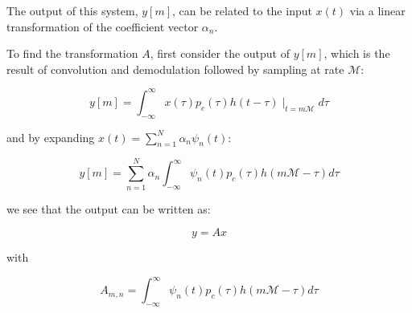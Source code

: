 \documentclass[12pt]{report}
\begin{document}
The output of this system, \(y\left[m\right]\), can be related to the input \(x\left(t\right)\) via a linear transformation of the coefficient vector \(\alpha_n\). 

To find the transformation \(A\), first consider the output of \(y\left[m\right]\), which is the result of convolution and demodulation followed by sampling at rate \(\mathcal{M}\):

\begin{equation}
y\left[m\right] = \int_{-\infty}^{\infty} x\left(\tau\right)p_c\left(\tau\right)h\left(t - \tau\right)\mid_{t = m\mathcal{M}}d\tau
\end{equation}

and by expanding \(x\left(t\right) = \sum_{n=1}^N \alpha_n \psi_n\left(t\right)\):

\begin{equation}
y\left[m\right] =  \sum_{n=1}^N \alpha_n \int_{-\infty}^{\infty} \psi_n\left(t\right)p_c\left(\tau\right)h\left(m\mathcal{M} - \tau\right)d\tau
\end{equation}

we see that the output can be written as:

\begin{equation}
y = Ax
\end{equation}

with

\begin{equation}
A_{m,n} = \int_{-\infty}^{\infty} \psi_n\left(t\right)p_c\left(\tau\right)h\left(m\mathcal{M} - \tau\right)d\tau
\end{equation}


\end{document}
